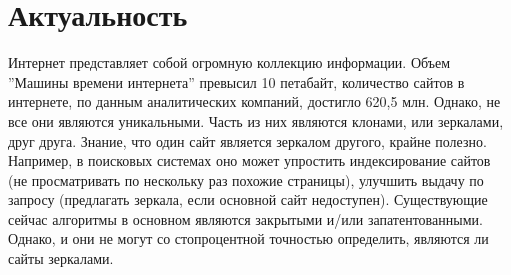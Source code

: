 \section{Актуальность}
Интернет представляет собой огромную коллекцию информации. Объем ''Машины времени интернета'' превысил 10 петабайт, количество сайтов в интернете, по данным аналитических компаний, достигло 620,5 млн. %
Однако, не все они являются уникальными. Часть из них являются клонами, или зеркалами, друг друга. Знание, что один сайт является зеркалом другого, крайне полезно. Например, в поисковых системах оно может упростить индексирование сайтов (не просматривать по нескольку раз похожие страницы), улучшить выдачу по запросу (предлагать зеркала, если основной сайт недоступен). %
Существующие сейчас алгоритмы в основном являются закрытыми и/или запатентованными. Однако, и они не могут со стопроцентной точностью определить, являются ли сайты зеркалами.